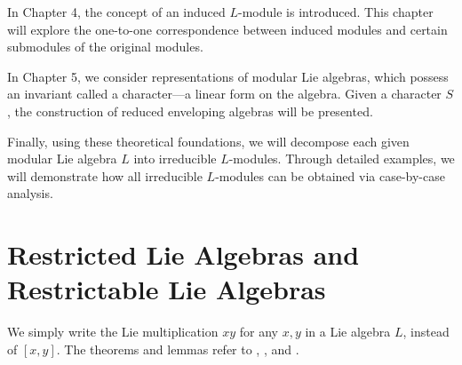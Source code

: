 \documentclass[12pt,MSc]{muthesis_2023}
\theoremstyle{plain}%
\theoremstyle{definition}
\theoremstyle{remark}
\begin{document}
In Chapter 4, the concept of an induced $L$-module is introduced. This chapter will explore the one-to-one correspondence between induced modules and certain submodules of the original modules.

In Chapter 5, we consider representations of modular Lie algebras, which possess an invariant called a character—a linear form on the algebra. Given a character $S$, the construction of reduced enveloping algebras will be presented.

Finally, using these theoretical foundations, we will decompose each given modular Lie algebra $L$ into irreducible $L$-modules. Through detailed examples, we will demonstrate how all irreducible $L$-modules can be obtained via case-by-case analysis.




\chapter{Restricted Lie Algebras and Restrictable Lie Algebras}
We simply write the Lie multiplication $xy$ for any $x,y$ in a Lie algebra $L$, instead of $[x,y]$. The theorems and lemmas refer to \cite[Section 3, Chapter 2]{SF}, \cite[Chapter 2]{N}, \cite{F} and \cite{H}.
\end{document}
